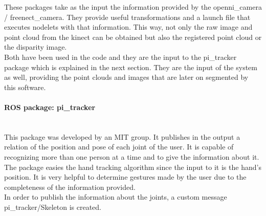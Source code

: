 		These packages take as the input the information provided by the openni\_camera / freenect\_camera. They provide useful transformations and a launch file that executes nodelets with that information. This way, not only the raw image and point cloud from the kinect can be obtained but also the registered point cloud or the disparity image. 
		\\

		Both have been used in the code and they are the input to the pi\_tracker package which is explained in the next section. They are the input of the system as well, providing the point clouds and images that are later on segmented by this software. 


		\paragraph{ROS package: pi\_tracker}\mbox{} \\

		This package was developed by an MIT group. It publishes in the output a relation of the position and pose of each joint of the user. It is capable of recognizing more than one person at a time and to give the information about it. 
		\\

		The package easies the hand tracking algorithm since the input to it is the hand's position. It is very helpful to determine gestures made by the user due to the completeness of the information provided. 
		\\

		In order to publish the information about the joints, a custom message pi\_tracker/Skeleton is created. 

